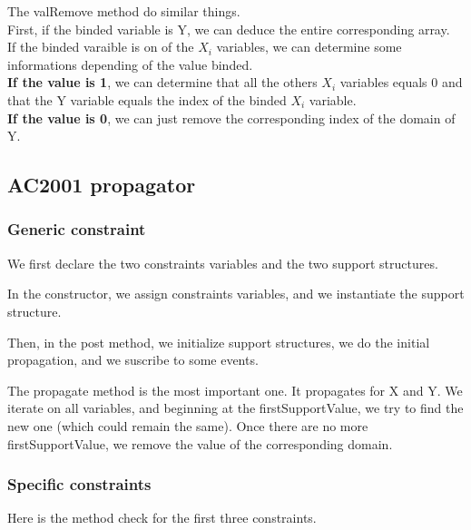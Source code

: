 \documentclass[a4paper ,12pt,french]{article}
\begin{document}


The valRemove method do similar things.\\
First, if the binded variable is Y, we can deduce the entire corresponding array.\\
If the binded varaible is on of the $X_i$ variables, we can determine some informations depending of the value binded.\\
\textbf{If the value is 1}, we can determine that all the others $X_i$ variables equals 0 and that the Y variable equals the index of the binded $X_i$ variable. \\ \textbf{If the value is 0}, we can just remove the corresponding index of the domain of Y.


\subsection{AC2001 propagator}


\subsubsection{Generic constraint}
We first declare the two constraints variables and the two support structures.


In the constructor, we assign constraints variables, and we instantiate the support structure.


Then, in the post method, we initialize support structures, we do the initial propagation, and we suscribe to some events.


The propagate method is the most important one. It propagates for X and Y. We iterate on all variables, and beginning at the firstSupportValue, we try to find the new one (which could remain the same). Once there are no more firstSupportValue, we remove the value of the corresponding domain.


\subsubsection{Specific constraints}
Here is the method check for the first three constraints.

\end{document}
